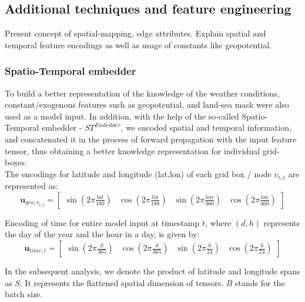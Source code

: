 

\subsection{Additional techniques and feature engineering}\label{chap:feat_eng}
Present concept of spatial-mapping, edge attributes. Explain spatial and temporal feature encodings as well as usage of constants like geopotential. 

\subsubsection{Spatio-Temporal embedder}
To build a better representation of the knowledge of the weather conditions, constant/exogenous features such as geopotential, and land-sea mask were also used as a model input. In addition, with the help of the so-called Spatio-Temporal embedder - $ST^{Embedder}$, we encoded spatial and temporal information, and concatenated it in the process of forward propagation with the input feature tensor, thus obtaining a better knowledge representation for individual grid-boxes. \\

\noindent The encodings for latitude and longitude (lat,lon) of each grid box / node $v_{i,j}$ are represented as:
\[
\mathbf{u}_{geo, v_{i,j}} =
\begin{bmatrix}
    \sin{(2\pi\frac{lat}{180})} &
    \cos{(2\pi\frac{lat}{180})} &
    \sin{(2\pi\frac{lon}{360})} &
    \cos{(2\pi\frac{lon}{360})}
\end{bmatrix}
\]

\noindent Encoding of time for entire model input at timestamp $t$, where $(d, h)$ represents the day of the year and the hour in a day, is given by:
\[
\mathbf{u}_{time,t} =
\begin{bmatrix}
    \sin{(2\pi\frac{d}{365})} &
    \cos{(2\pi\frac{d}{365})} &
    \sin{(2\pi\frac{h}{24})} &
    \cos{(2\pi\frac{h}{24})}
\end{bmatrix}
\]

\noindent In the subsequent analysis, we denote the product of latitude and longitude spans as $S$. It represents the flattened spatial dimension of tensors. $B$ stands for the batch size. \\ 

